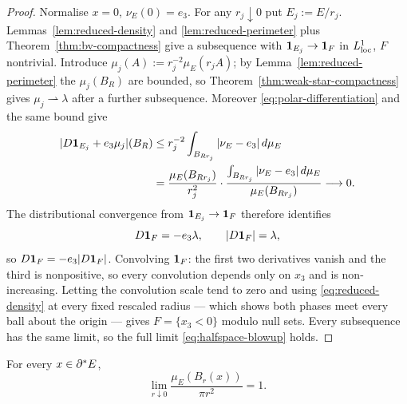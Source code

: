 \begin{proof}
Normalise $x=0$, $\nu_E(0)=e_3$.  For any $r_j\downarrow0$ put
$E_j:=E/r_j$.  Lemmas~\ref{lem:reduced-density} and
\ref{lem:reduced-perimeter} plus Theorem~\ref{thm:bv-compactness} give a
subsequence with $\mathbf 1_{E_j}\to\mathbf 1_{F}$ in $L^1_{\mathrm{loc}}$, $F$ nontrivial.  Introduce
$\mu_j(A):=r_j^{-2}\mu_E(r_jA)$; by Lemma~\ref{lem:reduced-perimeter} the
$\mu_j(B_R)$ are bounded, so Theorem~\ref{thm:weak-star-compactness} gives
$\mu_j\rightharpoonup\lambda$ after a further subsequence.  Moreover
\eqref{eq:polar-differentiation} and the same bound give
\begin{equation}\label{eq:blowup-polar-error}
\begin{aligned}
  |D\mathbf 1_{E_j}+e_3\mu_j|(B_R)
  &\le r_j^{-2}\int_{B_{Rr_j}}|\nu_E-e_3|\,d\mu_E\\
  &=\frac{\mu_E(B_{Rr_j})}{r_j^2}\cdot
    \frac{\int_{B_{Rr_j}}|\nu_E-e_3|\,d\mu_E}{\mu_E(B_{Rr_j})}
  \longrightarrow0 .
\end{aligned}
\end{equation}
The distributional convergence from $\mathbf 1_{E_j}\to\mathbf 1_{F}$ therefore identifies
\begin{equation}\label{eq:blowup-limit-polar}
  D\mathbf 1_{F}=-e_3\lambda,\qquad |D\mathbf 1_{F}|=\lambda,
\end{equation}
so $D\mathbf 1_{F}=-e_3|D\mathbf 1_{F}|$.  Convolving $\mathbf 1_{F}$: the first two derivatives
vanish and the third is nonpositive, so every convolution depends only on
$x_3$ and is non-increasing.  Letting the convolution scale tend to zero and
using \eqref{eq:reduced-density} at every fixed rescaled radius --- which
shows both phases meet every ball about the origin --- gives
$F=\{x_3<0\}$ modulo null sets.  Every subsequence has the same limit, so
the full limit \eqref{eq:halfspace-blowup} holds.
\end{proof}

\begin{theorem}\label{thm:exact-density}
For every $x\in\partial^* E$,
\begin{equation}\label{eq:exact-density}
  \lim_{r\downarrow0}\frac{\mu_E(B_r(x))}{\pi r^2}=1 .
\end{equation}
\end{theorem}

